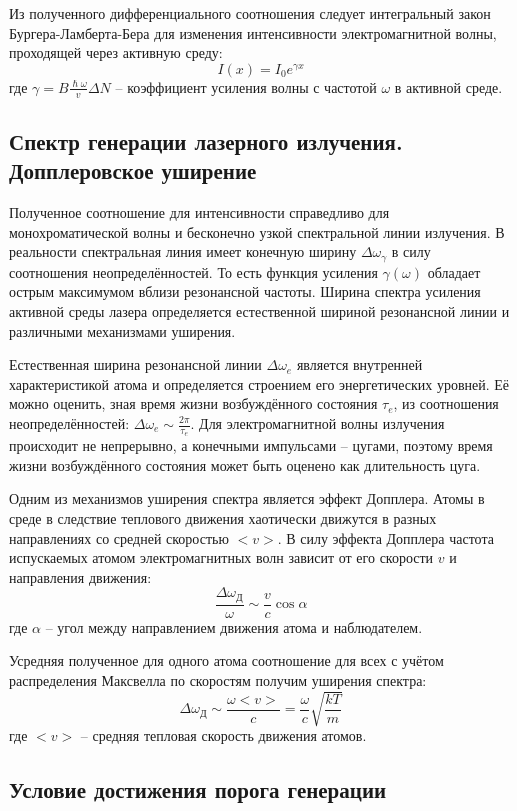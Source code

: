 Из полученного дифференциального соотношения следует интегральный закон 
Бургера-Ламберта-Бера для изменения интенсивности электромагнитной волны, 
проходящей через активную среду:
$$
I(x) = I_0 e^{\gamma x}
$$
где $\gamma = B \frac{\hslash \omega}{v} \Delta N$ -- коэффициент усиления 
волны с частотой $\omega$ в активной среде.

\subsection*{Спектр генерации лазерного излучения. Допплеровское уширение}

Полученное соотношение для интенсивности справедливо для монохроматической 
волны и бесконечно узкой спектральной линии излучения. В реальности 
спектральная линия имеет конечную ширину $\Delta \omega_\gamma$ в силу 
соотношения неопределённостей. То есть функция усиления $\gamma(\omega)$ 
обладает острым максимумом вблизи резонансной частоты. Ширина спектра усиления 
активной среды лазера определяется естественной шириной резонансной линии и 
различными механизмами уширения.

Естественная ширина резонансной линии $\Delta \omega_e$ является внутренней 
характеристикой атома и определяется строением его энергетических уровней. Её 
можно оценить, зная время жизни возбуждённого состояния $\tau_e$, из 
соотношения неопределённостей: $\Delta \omega_e \sim \frac{2\pi}{\tau_e}$. Для 
электромагнитной волны излучения происходит не непрерывно, а конечными 
импульсами -- цугами, поэтому время жизни возбуждённого состояния может быть 
оценено как длительность цуга.

Одним из механизмов уширения спектра является эффект Допплера. Атомы в среде в 
следствие теплового движения хаотически движутся в разных направлениях со 
средней скоростью $<v>$. В силу эффекта Допплера частота испускаемых атомом
электромагнитных волн зависит от его скорости $v$ и направления движения:
$$
\frac{\Delta \omega_Д}{\omega} \sim \frac{v}{c} \cos \alpha
$$
где $\alpha$ -- угол между направлением движения атома и наблюдателем. 

Усредняя полученное для одного атома соотношение для всех с учётом 
распределения Максвелла по скоростям получим уширения спектра:
$$
\Delta \omega_Д \sim \frac{\omega <v>}{c} = \frac{\omega}{c} \sqrt{\frac{kT}{m}}
$$
где $<v>$ -- средняя тепловая скорость движения атомов.

\subsection*{Условие достижения порога генерации}

